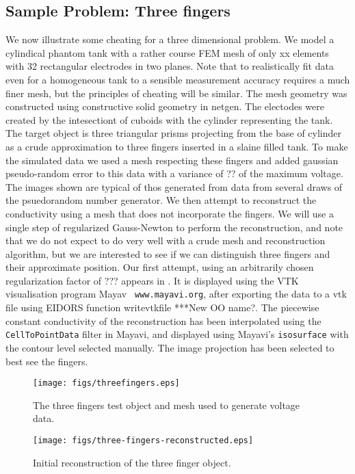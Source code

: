 \documentclass[12pt]{iopart}
\begin{document}
\subsection{
Sample Problem: Three fingers
}
We now illustrate some cheating for a three dimensional
problem. We model a cylindical phantom tank with a rather
course FEM mesh of only xx elements with 32 rectangular
electrodes in two planes. Note that to realistically
fit data even for a homogeneous tank to a sensible
measurement accuracy requires a much finer mesh, but the
principles of cheating will be similar. The mesh geometry
was constructed using constructive solid geometry in
netgen. The electodes were created by the intesectiont
of cuboids with the cylinder representing the tank. The
target object is three triangular prisms projecting from
the base of cylinder as a crude approximation to three
fingers inserted in a slaine filled tank. To make the
simulated data we used a mesh respecting these fingers
 and added gaussian pseudo-random
error to this data with a variance of ?? of the maximum
voltage. The images shown are typical of thos generated
from data from several draws of the psuedorandom number
generator. We then attempt to reconstruct the conductivity
using a mesh that does not incorporate the fingers. We will
use a single step of regularized Gauss-Newton to perform
the reconstruction, and note that we do not expect to do
very well with a crude mesh and reconstruction algorithm,
but we are interested to see if we can distinguish three
fingers and their approximate position. Our first attempt,
using an arbitrarily chosen regularization factor
of ??? appears in . It is
displayed using the VTK visualisation program Mayav {\tt
www.mayavi.org}, after exporting the data to a vtk file
using EIDORS function writevtkfile ***New OO name?. The
piecewise constant conductivity of the reconstruction has
been interpolated using the {\tt CellToPointData} filter in
Mayavi, and displayed using Mayavi's {\tt isosurface} with
the contour level selected manually. The image projection
has been selected to best see the fingers.

%
%
\begin{figure}[th]
\texttt{[image: figs/threefingers.eps]}
\caption{\label{fig:threefingers}The three fingers test object and mesh used to generate voltage data.}
\end{figure}



%
%
\begin{figure}[th]
\texttt{[image: figs/three-fingers-reconstructed.eps]}
\caption{\label{fig:3fingers1}
Initial reconstruction of the three finger object.}
\end{figure}
\end{document}
